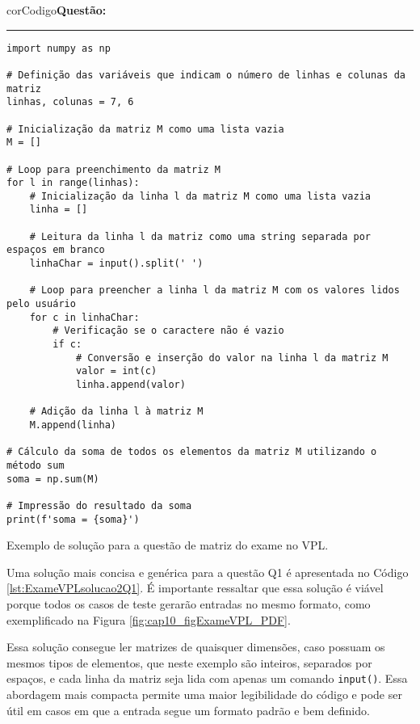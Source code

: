 \begin{listing}[!ht]
\begin{myboxCode}{corCodigo}{\textbf{Questão: } }\vspace{3mm}
\hrule
\begin{verbatim}
import numpy as np

# Definição das variáveis que indicam o número de linhas e colunas da matriz
linhas, colunas = 7, 6

# Inicialização da matriz M como uma lista vazia
M = []

# Loop para preenchimento da matriz M
for l in range(linhas):
    # Inicialização da linha l da matriz M como uma lista vazia
    linha = []
    
    # Leitura da linha l da matriz como uma string separada por espaços em branco
    linhaChar = input().split(' ')
    
    # Loop para preencher a linha l da matriz M com os valores lidos pelo usuário
    for c in linhaChar:
        # Verificação se o caractere não é vazio
        if c:
            # Conversão e inserção do valor na linha l da matriz M
            valor = int(c)
            linha.append(valor)
    
    # Adição da linha l à matriz M
    M.append(linha)

# Cálculo da soma de todos os elementos da matriz M utilizando o método sum 
soma = np.sum(M)

# Impressão do resultado da soma
print(f'soma = {soma}')
\end{verbatim}
\end{myboxCode}
\caption{Exemplo de solução para a questão de matriz do exame no VPL.}
\label{lst:ExameVPLsolucaoQ1}
\end{listing}

Uma solução mais concisa e genérica para a questão Q1 é apresentada no Código \ref{lst:ExameVPLsolucao2Q1}. É importante ressaltar que essa solução é viável porque todos os casos de teste gerarão entradas no mesmo formato, como exemplificado na Figura \ref{fig:cap10_figExameVPL_PDF}.

Essa solução consegue ler matrizes de quaisquer dimensões, caso possuam os mesmos tipos de elementos, que neste exemplo são inteiros, separados por espaços, e cada linha da matriz seja lida com apenas um comando \verb|input()|. Essa abordagem mais compacta permite uma maior legibilidade do código e pode ser útil em casos em que a entrada segue um formato padrão e bem definido.

